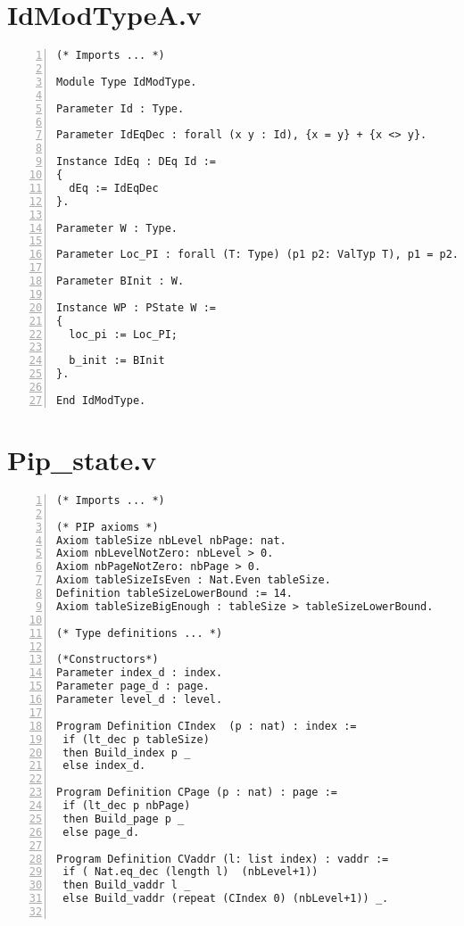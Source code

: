 \begin{appendices}
\chapter{IdModTypeA.v} \label{ModType}
\begin{lstlisting}[xleftmargin=-.1\textwidth,
xrightmargin=-.1\textwidth,
mathescape=true,numbers=left]
(* Imports ... *)

Module Type IdModType.

Parameter Id : Type.

Parameter IdEqDec : forall (x y : Id), {x = y} + {x <> y}.

Instance IdEq : DEq Id :=
{
  dEq := IdEqDec
}.

Parameter W : Type.

Parameter Loc_PI : forall (T: Type) (p1 p2: ValTyp T), p1 = p2.

Parameter BInit : W.

Instance WP : PState W :=
{
  loc_pi := Loc_PI;
  
  b_init := BInit
}.              
  
End IdModType.
\end{lstlisting}

\chapter{Pip\_state.v} \label{stateFile}
\begin{lstlisting}[xleftmargin=-.1\textwidth,
xrightmargin=-.1\textwidth,
mathescape=true,numbers=left]
(* Imports ... *)

(* PIP axioms *)
Axiom tableSize nbLevel nbPage: nat.
Axiom nbLevelNotZero: nbLevel > 0.
Axiom nbPageNotZero: nbPage > 0.
Axiom tableSizeIsEven : Nat.Even tableSize.
Definition tableSizeLowerBound := 14.  
Axiom tableSizeBigEnough : tableSize > tableSizeLowerBound. 

(* Type definitions ... *)

(*Constructors*)
Parameter index_d : index.
Parameter page_d : page.
Parameter level_d : level.

Program Definition CIndex  (p : nat) : index := 
 if (lt_dec p tableSize) 
 then Build_index p _ 
 else index_d.

Program Definition CPage (p : nat) : page := 
 if (lt_dec p nbPage) 
 then Build_page p _ 
 else page_d.

Program Definition CVaddr (l: list index) : vaddr := 
 if ( Nat.eq_dec (length l)  (nbLevel+1))  
 then Build_vaddr l _
 else Build_vaddr (repeat (CIndex 0) (nbLevel+1)) _.


\end{lstlisting}
\end{appendices}
